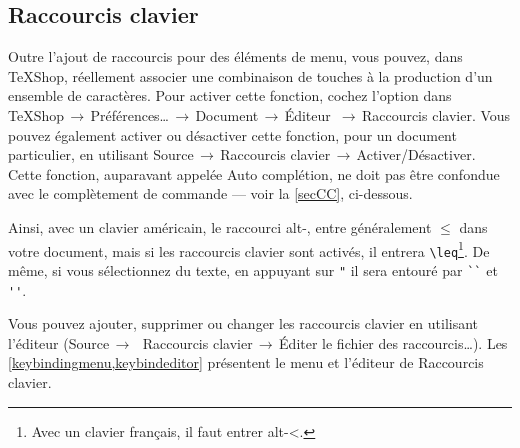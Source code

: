\documentclass[11pt,french]{article}
\newcommand{\TS}{\textsf{\TeX Shop}}
\newcommand{\cmd}[1]{\textsf{#1}}
\newcommand{\mnu}[1]{\textsf{#1}}
\newcommand{\To}{\,\(\to\)\,}
\begin{document}

\subsection{Raccourcis clavier}

Outre l'ajout de raccourcis pour des éléments de menu, vous pouvez, dans \TS{}, réellement associer une combinaison de touches à la production d'un ensemble de caractères. Pour activer cette fonction, cochez l'option dans  \mnu{TeXShop}\To\mnu{Préférences…}\To\mnu{Document}\To\mnu{Éditeur} \To\mnu{Raccourcis clavier}. Vous pouvez également activer ou désactiver cette fonction, pour un document particulier, en utilisant \mnu{Source}\To\mnu{Raccourcis clavier}\To\mnu{Activer/Désactiver}. Cette fonction, auparavant appelée Auto complétion, ne doit pas être confondue avec le complètement de commande --- voir la \cref{secCC}, ci-dessous.


Ainsi, avec un clavier américain, le raccourci \cmd{alt-,} entre généralement \texttt{\(\leq\)} dans votre document, mais si les raccourcis clavier sont activés, il entrera \verb|\leq|\footnote{Avec un clavier français, il faut entrer \cmd{alt-<}.}. De même, si vous sélectionnez du texte, en appuyant sur \verb|"| il sera entouré par \verb|``| et \verb|''|. 


Vous pouvez ajouter, supprimer ou changer les raccourcis clavier en utilisant l'éditeur (\mnu{Source}\To\ \mnu{Raccourcis clavier}\To\mnu{Éditer le fichier des raccourcis…}). Les \vref{keybindingmenu,keybindeditor} présentent le menu et l'éditeur de \mnu{Raccourcis clavier}. 
\end{document}
